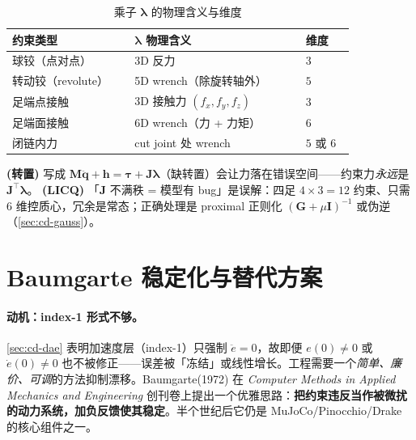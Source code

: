 \begin{table}[H]\centering\small
\caption{乘子 $\boldsymbol\lambda$ 的物理含义与维度}
\label{tab:cd-lambda}
\begin{tabular}{p{0.30\linewidth}p{0.42\linewidth}p{0.12\linewidth}}
\toprule
约束类型 & $\boldsymbol\lambda$ 物理含义 & 维度 \\
\midrule
球铰（点对点） & 3D 反力 & $3$ \\
转动铰（revolute） & 5D wrench（除旋转轴外） & $5$ \\
足端点接触 & 3D 接触力 $(f_x,f_y,f_z)$ & $3$ \\
足端面接触 & 6D wrench（力 + 力矩） & $6$ \\
闭链内力 & cut joint 处 wrench & $5$ 或 $6$ \\
\bottomrule
\end{tabular}
\end{table}

\begin{pitfall}
\textbf{(转置)} 写成 $\mathbf M\ddot{\mathbf q}+\mathbf h=\boldsymbol\tau+\mathbf J\boldsymbol\lambda$（缺转置）会让力落在错误空间——约束力\emph{永远}是 $\mathbf J^\top\boldsymbol\lambda$。\;
\textbf{(LICQ)} 「$\mathbf J$ 不满秩 = 模型有 bug」是误解：四足 $4\times3=12$ 约束、只需 $6$ 维控质心，冗余是常态；正确处理是 proximal 正则化 $(\mathbf G+\mu\mathbf I)^{-1}$ 或伪逆（\cref{sec:cd-gauss}）。
\end{pitfall}

\section{Baumgarte 稳定化与替代方案}
\label{sec:cd-baumgarte}

\paragraph{动机：index-1 形式不够。}
\cref{sec:cd-dae} 表明加速度层（index-1）只强制 $\ddot e=0$，故即便 $e(0)\neq0$ 或 $\dot e(0)\neq0$ 也不被修正——误差被「冻结」或线性增长。工程需要一个\emph{简单、廉价、可调}的方法抑制漂移。Baumgarte(1972) 在 \emph{Computer Methods in Applied Mechanics and Engineering} 创刊卷上提出一个优雅思路：\textbf{把约束违反当作被微扰的动力系统，加负反馈使其稳定}。半个世纪后它仍是 MuJoCo/Pinocchio/Drake 的核心组件之一。

